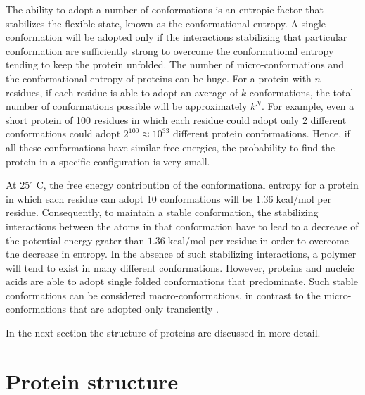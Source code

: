 
The ability to adopt a number of conformations is an entropic factor that stabilizes the flexible state, known as the conformational entropy.%
A single conformation will be adopted only if the interactions stabilizing that particular conformation are sufficiently strong to overcome the conformational entropy tending to keep the protein unfolded. The number of micro-conformations and the conformational entropy of proteins can be huge. For a protein with $n$ residues, if each residue is able to adopt an average of $k$ conformations, the total number of conformations possible will be approximately $k^N$. For example, even a short protein of 100 residues in which each residue could adopt only 2 different conformations could adopt $2^{100} \approx 10^{33}$ different protein conformations. Hence, if all these conformations have similar free energies, the probability to find the protein in a specific configuration is very small. 

At 25$^\circ$ C, the free energy contribution of the conformational entropy for a protein in which each residue can adopt 10 conformations will be $1.36 \;\text{kcal}/\text{mol}$ per residue. Consequently, to maintain a stable conformation, the stabilizing interactions between the atoms in that conformation have to lead to a decrease of the potential energy grater than $1.36 \;\text{kcal}/\text{mol}$ per residue in order to overcome the decrease in entropy. In the absence of such stabilizing interactions, a polymer will tend to exist in many different conformations. However, proteins and nucleic acids are able to adopt single folded conformations that predominate. Such stable conformations can be considered macro-conformations, in contrast to the micro-conformations that are adopted only transiently
 \cite{creighton2010biophysical}.

In the next section the structure of proteins are discussed in more detail.

\section{Protein structure}\label{sec:prot-structure}

